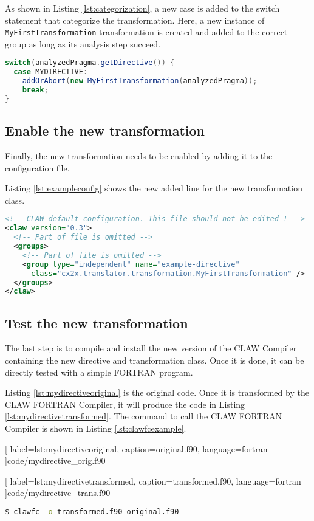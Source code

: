 As shown in Listing \ref{lst:categorization}, a new case is added to the switch
statement that categorize the transformation. Here, a new instance of
\lstinline|MyFirstTransformation| transformation is created and added to the
correct group as long as its analysis step succeed.

\begin{lstlisting}[label=lst:categorization, caption=ClawXcodeMlTranslator.java, language=java]
switch(analyzedPragma.getDirective()) {
  case MYDIRECTIVE:
    addOrAbort(new MyFirstTransformation(analyzedPragma));
    break;
}
\end{lstlisting}


\subsection{Enable the new transformation}
Finally, the new transformation needs to be enabled by adding it to the
configuration file.

Listing \ref{lst:exampleconfig} shows the new added line for the new
transformation class.

\begin{lstlisting}[label=lst:exampleconfig, caption=claw-default.xml, language=xml]
<!-- CLAW default configuration. This file should not be edited ! -->
<claw version="0.3">
  <!-- Part of file is omitted -->
  <groups>
    <!-- Part of file is omitted -->
    <group type="independent" name="example-directive"
      class="cx2x.translator.transformation.MyFirstTransformation" />
  </groups>
</claw>
\end{lstlisting}

\subsection{Test the new transformation}
The last step is to compile and install the new version of the CLAW Compiler
containing the new directive and transformation class. Once it is done, it
can be directly tested with a simple FORTRAN program.

Listing \ref{lst:mydirectiveoriginal} is the original code. Once it is
transformed by the CLAW FORTRAN Compiler, it will produce the code
in Listing \ref{lst:mydirectivetransformed}. The command to call
the CLAW FORTRAN Compiler is shown in Listing \ref{lst:clawfcexample}.


  [
    label=lst:mydirectiveoriginal,
    caption=original.f90,
    language=fortran
  ]{code/mydirective_orig.f90}


  [
    label=lst:mydirectivetransformed,
    caption=transformed.f90,
    language=fortran
  ]{code/mydirective_trans.f90}

\begin{lstlisting}[label=lst:clawfcexample, caption=Call the compiler, language=bash]
$ clawfc -o transformed.f90 original.f90
\end{lstlisting}
